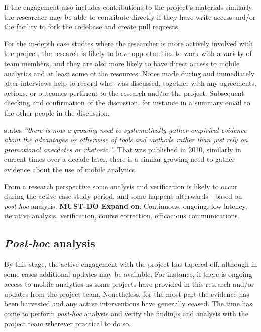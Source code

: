 If the engagement also includes contributions to the project's materials similarly the researcher may be able to contribute directly if they have write access and/or the facility to fork the codebase and create pull requests.

For the in-depth case studies where the researcher is more actively involved with the project, the research is likely to have opportunities to work with a variety of team members, and they are also more likely to have direct access to mobile analytics and at least some of the resources. Notes made during and immediately after interviews help to record what was discussed, together with any agreements, actions, or outcomes pertinent to the research and/or the project. Subsequent checking and confirmation of the discussion, for instance in a summary email to the other people in the discussion, 

\citet[p.250]{falessi2010_applying_ESE_to_sw_architecture_etc} states \emph{``there is now a growing need to systematically gather empirical evidence about the advantages or otherwise of tools and methods rather than just rely on promotional anecdotes or rhetoric."}. That was published in 2010, similarly in current times over a decade later, there is a similar growing need to gather evidence about the use of mobile analytics.


From a research perspective some analysis and verification is likely to occur during the active case study period, and some happens afterwards - based on \emph{post-hoc} analysis. \textbf{MUST-DO Expand on}: Continuous, ongoing, low latency, iterative analysis, verification, course correction, efficacious communications. 

\subsection{\emph{Post-hoc} analysis}
By this stage, the active engagement with the project has tapered-off, although in some cases additional updates may be available. For instance, if there is ongoing access to mobile analytics as some projects have provided in this research and/or updates from the project team. Nonetheless, for the most part the evidence has been harvested and any active interventions have generally ceased. The time has come to perform \emph{post-hoc} analysis and verify the findings and analysis with the project team wherever practical to do so. 

